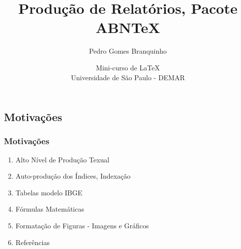 \documentclass{beamer}
\title[Relatórios]{\Huge{Produção de Relatórios, Pacote ABNTeX}}
\author[Branquinho]{Pedro Gomes Branquinho \\
  \text{\scriptsize{pedro.branquinho@usp.br}}}
\date[ABNTeX]{\scriptsize{Mini-curso de \LaTeX \\ Universidade de São Paulo - DEMAR}}
\begin{document}
{
  \begin{frame}
    \titlepage
  \end{frame}
}



\begin{frame}
  \section{Motivações}
  \frametitle{Motivações}

  \begin{enumerate}
  \item<1->{Alto Nível de Produção Texual}
  \item<3->{Auto-produção dos Índices, Indexação}
  \item<2->{Tabelas modelo IBGE}
  \item<4->{Fórmulas Matemáticas}
  \item<6->{Formatação de Figuras - Imagens e Gráficos}
  \item<5->{Referências}
  \end{enumerate}

\end{frame}
\end{document}
